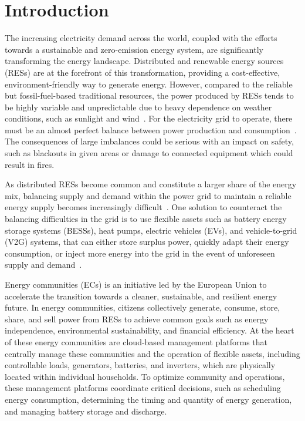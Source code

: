 \section{Introduction}

The increasing electricity demand across the world, coupled with the efforts towards a sustainable and zero-emission energy system, are significantly transforming the energy landscape. Distributed and renewable energy sources (RESs) are at the forefront of this transformation, providing a cost-effective, environment-friendly way to generate energy. However, compared to the reliable but fossil-fuel-based traditional resources, the power produced by RESs tends to be highly variable and unpredictable due to heavy dependence on weather conditions, such as sunlight and wind~\cite{Oshnoei_2020, Saini_2023, afzal2024security, mohan2020comprehensive, Ibraheem_2023}. For the electricity grid to operate, there must be an almost perfect balance between power production and consumption~\cite{Rinaldi_2022}. The consequences of large imbalances could be serious with an impact on safety, such as blackouts in given areas or damage to connected equipment which could result in fires. %

As distributed RESs become common and constitute a larger share of the energy mix, balancing supply and demand within the power grid to maintain a reliable energy supply becomes increasingly difficult~\cite{iva_svängmassa,problem_renewable_load_demand}. One solution to counteract the balancing difficulties in the grid is to use flexible assets such as battery energy storage systems (BESSs), heat pumps, electric vehicles (EVs), and vehicle-to-grid (V2G) systems, that can either store surplus power, quickly adapt their energy consumption, or inject more energy into the grid in the event of unforeseen supply and demand~\cite{flex_report}. 

Energy communities (ECs) is an initiative led by the European Union to accelerate the transition towards a cleaner, sustainable, and resilient energy future. In energy communities, citizens collectively generate, consume, store, share, and sell power from RESs to achieve common goals such as energy independence, environmental sustainability, and financial efficiency. At the heart of these energy communities are cloud-based management platforms that centrally manage these communities and the operation of flexible assets, including controllable loads, generators, batteries, and inverters, which are physically located within individual households. To optimize community and operations, these management platforms coordinate critical decisions, such as scheduling energy consumption, determining the timing and quantity of energy generation, and managing battery storage and discharge. 

